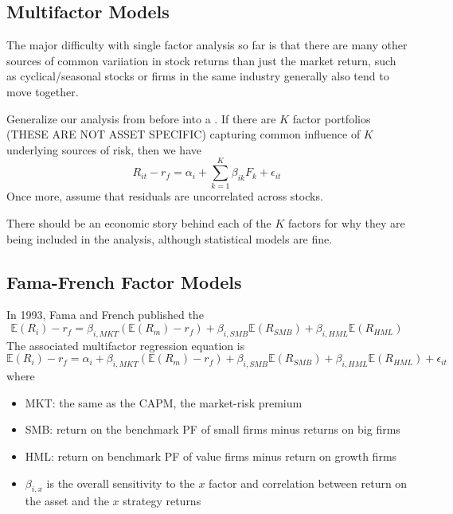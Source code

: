 \documentclass[12pt]{scrartcl}
\newcommand{\E}{\mathbb{E}}
\begin{document}
\subsection{Multifactor Models}

\begin{note}
  The major difficulty with single factor analysis so far is that there are many other 
  sources of common variiation in stock returns than just the market return, such as 
  cyclical/seasonal stocks or firms in the same industry generally also tend to move together.
\end{note}

\begin{definition}
  Generalize our analysis from before into a . If there are 
  $K$ factor portfolios (THESE ARE NOT ASSET SPECIFIC) capturing common influence of 
  $K$ underlying sources of risk, then we have 
  \[R_{it} - r_f = \alpha_i + \sum_{k=1}^K \beta_{ik} F_k + \epsilon_{it}\]
  Once more, assume that residuals are uncorrelated across stocks.
\end{definition}

\begin{note}
  There should be an economic story behind each of the $K$ factors for why they are 
  being included in the analysis, although statistical models are fine.
\end{note}

\subsection{Fama-French Factor Models}

\begin{definition}
  In 1993, Fama and French published the 
  \[\E(R_i) - r_f = \beta_{i, MKT} ( \E(R_m) - r_f) + \beta_{i, SMB} \E(R_{SMB}) + \beta_{i, HML}\E(R_{HML})\]
  The associated multifactor regression equation is 
  \[\E(R_i) - r_f = \alpha_i + \beta_{i, MKT} ( \E(R_m) - r_f) + \beta_{i, SMB} \E(R_{SMB}) + \beta_{i, HML}\E(R_{HML}) + \epsilon_{it}\]
  where 
  \begin{itemize}
    \item MKT: the same as the CAPM, the market-risk premium
    \item SMB: return on the benchmark PF of small firms minus returns on big firms
    \item HML: return on benchmark PF of value firms minus return on growth firms
    \item $\beta_{i, x}$ is the overall sensitivity to the $x$ factor and correlation between return on the asset and the $x$ strategy returns
  \end{itemize}
\end{definition}
\end{document}
